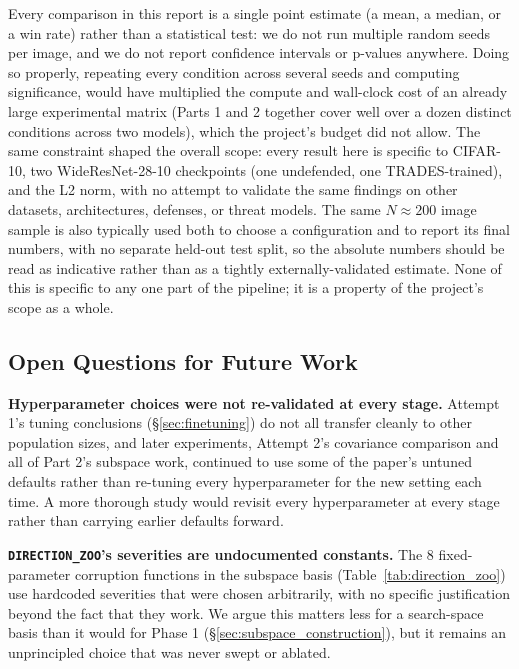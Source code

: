 \documentclass[11pt, a4paper]{article}
\begin{document}
Every comparison in this report is a single point estimate (a mean, a median, or a win rate) rather than a statistical test: we do not run multiple random seeds per image, and we do not report confidence intervals or p-values anywhere. Doing so properly, repeating every condition across several seeds and computing significance, would have multiplied the compute and wall-clock cost of an already large experimental matrix (Parts 1 and 2 together cover well over a dozen distinct conditions across two models), which the project's budget did not allow. The same constraint shaped the overall scope: every result here is specific to CIFAR-10, two WideResNet-28-10 checkpoints (one undefended, one TRADES-trained), and the L2 norm, with no attempt to validate the same findings on other datasets, architectures, defenses, or threat models. The same $N{\approx}200$ image sample is also typically used both to choose a configuration and to report its final numbers, with no separate held-out test split, so the absolute numbers should be read as indicative rather than as a tightly externally-validated estimate. None of this is specific to any one part of the pipeline; it is a property of the project's scope as a whole.

\subsection{Open Questions for Future Work}

\textbf{Hyperparameter choices were not re-validated at every stage.} Attempt 1's tuning conclusions (\S\ref{sec:finetuning}) do not all transfer cleanly to other population sizes, and later experiments, Attempt 2's covariance comparison and all of Part 2's subspace work, continued to use some of the paper's untuned defaults rather than re-tuning every hyperparameter for the new setting each time. A more thorough study would revisit every hyperparameter at every stage rather than carrying earlier defaults forward.

\textbf{\texttt{DIRECTION\_ZOO}'s severities are undocumented constants.} The 8 fixed-parameter corruption functions in the subspace basis (Table~\ref{tab:direction_zoo}) use hardcoded severities that were chosen arbitrarily, with no specific justification beyond the fact that they work. We argue this matters less for a search-space basis than it would for Phase 1 (\S\ref{sec:subspace_construction}), but it remains an unprincipled choice that was never swept or ablated.
\end{document}
